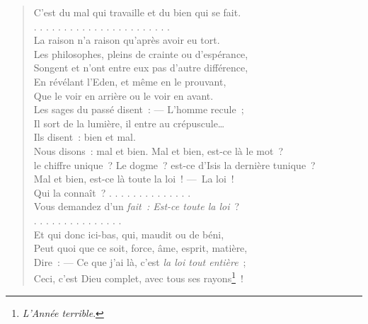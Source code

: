 \documentclass[french,twoside]{book} %
\begin{document}
\begin{verse}
C’est du mal qui travaille et du bien qui se fait.\\
. . . . . . . . . . . . . . . . . . . . . . .\\
La raison n’a raison qu’après avoir eu tort.\\
Les philosophes, pleins de crainte ou d’espérance,\\
Songent et n’ont entre eux pas d’autre différence,\\
En révélant l’Eden, et même en le prouvant,\\
Que le voir en arrière ou le voir en avant.\\
Les sages du passé disent : — L’homme recule ;\\
Il sort de la lumière, il entre au crépuscule…\\
Ils disent : bien et mal.\\
Nous disons : mal et bien. Mal et bien, est-ce là le mot ?\\
le chiffre unique ? Le dogme ? est-ce d’Isis la dernière tunique ?\\
Mal et bien, est-ce là toute la loi ! — La loi !\\
Qui la connaît ? . . . . . . . . . . . . . .\\
Vous demandez d’un \emph{fait : Est-ce toute la loi} ?\\
. . . . . . . . . . . . . . .\\
Et qui donc ici-bas, qui, maudit ou de béni,\\
Peut quoi que ce soit, force, âme, esprit, matière,\\
Dire : — Ce que j’ai là, c’est \emph{la loi tout entière} ;\\
Ceci, c’est Dieu complet, avec tous ses rayons\footnote{\emph{L’Année terrible}.} !\\
\end{verse}
\end{document}
